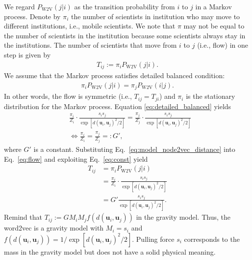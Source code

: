 \documentclass[12pt]{article} %
\def\vec#1{{\bm #1}}
\begin{document}
We regard $P_{\text{W2V}}(j \vert i)$ as the transition probability from $i$ to $j$ in a Markov process.
Denote by $\pi_i$ the number of scientists in institution who may move to different institutions, i.e., mobile scientists.
We note that $\pi$ may not be equal to the number of scientists in the institution because some scientists always stay in the institutions.
The number of scientists that move from $i$ to $j$ (i.e., flow) in one step is given by 
\begin{align}
    \label{eq:flow}
    T_{ij}:= \pi_i P_{\text{W2V}}(j \vert i).
\end{align}
We assume that the Markov process satisfies detailed balanced condition:  
\begin{align}
    \label{eq:detailed_balanced}
    \pi_i P_{\text{W2V}}\left(j \vert i \right) = \pi_j P_{\text{W2V}}\left(i \vert j \right).
\end{align}
In other words, the flow is symmetric (i.e., $T_{ij} = T_{ji}$) and $\pi_i$ is the stationary distribution for the Markov process.
Equation \eqref{eq:detailed_balanced} yields 
\begin{align}
    &\frac{\pi_i}{Z_i}\cdot \frac{s_i s_j}{\exp\left[d\left(\vec{u}_i, \vec{u}_j\right)^2 / 2\right]} = \frac{\pi_j}{Z_j}\cdot \frac{s_i s_j}{\exp\left[d\left(\vec{u}_i, \vec{u}_j\right)^2 / 2 \right]} \\
    &\iff \frac{\pi_i}{Z_i} = \frac{\pi_j}{Z_j} =: G', \label{eq:const}
\end{align}
where $G'$ is a constant. 
Substituting Eq.~\eqref{eq:model_node2vec_distance} into Eq.~\eqref{eq:flow} and exploiting Eq.~\eqref{eq:const} yield 
\begin{align}
    \label{eq:flow_gravity_model}
    T_{ij} &= \pi_i P_{\text{W2V}}\left(j \vert i \right)\nonumber \\
           &= \frac{\pi_i}{Z_i} \cdot \frac{s_i s_j}{\exp\left[d\left(\vec{u}_i, \vec{u}_j\right)^2 / 2 \right]}\nonumber \\ 
           &= G' \frac{s_i s_j}{\exp\left[d\left(\vec{u}_i, \vec{u}_j\right)^2 / 2 \right]}. 
\end{align}
Remind that $T_{ij}:= G M_i M_j f\left(d\left(\vec{u}_i,\vec{u}_j\right)\right)$ in the gravity model.
Thus, the word2vec is a gravity model with $M_i=s_i$ and $f\left(d\left(\vec{u}_i,\vec{u}_j\right)\right) = 1/\exp\left[d\left(\vec{u}_i,\vec{u}_j\right) ^ 2 /2\right]$.
Pulling force $s_i$ corresponds to the mass in the gravity model but does not have a solid physical meaning.
\end{document}
